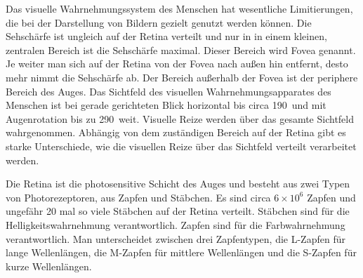 Das visuelle Wahrnehmungssystem des Menschen hat wesentliche Limitierungen, die bei der Darstellung von Bildern gezielt genutzt werden können.
Die Sehschärfe ist ungleich auf der Retina verteilt und nur in in einem kleinen, zentralen Bereich ist die Sehschärfe maximal.
Dieser Bereich wird Fovea genannt.
Je weiter man sich auf der Retina von der Fovea nach außen hin entfernt, desto mehr nimmt die Sehschärfe ab.
Der Bereich außerhalb der Fovea ist der periphere Bereich des Auges.
Das Sichtfeld des visuellen Wahrnehmungsapparates des Menschen ist bei gerade gerichteten Blick horizontal bis circa 190\,\textdegree{} und mit Augenrotation bis zu 290\,\textdegree{} weit.
Visuelle Reize werden über das gesamte Sichtfeld wahrgenommen.
Abhängig von dem zuständigen Bereich auf der Retina gibt es starke Unterschiede, wie die visuellen Reize über das Sichtfeld verteilt verarbeitet werden.

Die Retina ist die photosensitive Schicht des Auges und besteht aus zwei Typen von Photorezeptoren, aus Zapfen und Stäbchen.
Es sind circa $6\times10^6$ Zapfen und ungefähr 20 mal so viele Stäbchen auf der Retina verteilt.
Stäbchen sind für die Helligkeitswahrnehmung verantwortlich.
Zapfen sind für die Farbwahrnehmung verantwortlich.
Man unterscheidet zwischen drei Zapfentypen, die L-Zapfen für lange Wellenlängen, die M-Zapfen für mittlere Wellenlängen und die S-Zapfen für kurze Wellenlängen.

